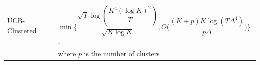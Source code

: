 \begin{center}
\begin{tabular}{ll}
UCB-Clustered             &\hspace*{5em}$\min\bigg\lbrace\dfrac{\sqrt{T}\log{(\dfrac{K^{4}(\log K)^{2}}{T})}}{\sqrt{K\log K}},O\bigg(\dfrac{(K+p)K\log (T\Delta^{4})}{p\Delta}\bigg)\bigg\rbrace$, \\& \hspace*{5em} where $p$ is the number of clusters \\
\end{tabular}
\end{center}


